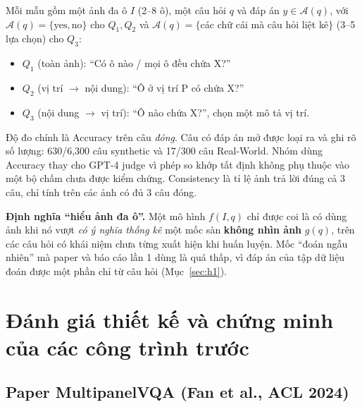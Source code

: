 \documentclass[12pt]{ai_conquer2026}
\begin{document}
Mỗi mẫu gồm một ảnh đa ô $I$ (2--8 ô), một câu hỏi $q$ và đáp án $y \in \mathcal{A}(q)$, với $\mathcal{A}(q) = \{\text{yes},\text{no}\}$ cho $Q_1, Q_2$ và $\mathcal{A}(q) = \{$các chữ cái mà câu hỏi liệt kê$\}$ (3--5 lựa chọn) cho $Q_3$:
\begin{itemize}
    \item $Q_1$ (toàn ảnh): ``Có ô nào / mọi ô đều chứa X?''
    \item $Q_2$ (vị trí $\rightarrow$ nội dung): ``Ô ở vị trí P có chứa X?''
    \item $Q_3$ (nội dung $\rightarrow$ vị trí): ``Ô nào chứa X?'', chọn một mô tả vị trí.
\end{itemize}
Độ đo chính là Accuracy trên câu \emph{đóng}. Câu có đáp án mở được loại ra và ghi rõ số lượng: 630/6{,}300 câu synthetic và 17/300 câu Real-World. Nhóm dùng Accuracy thay cho GPT-4 judge vì phép so khớp tất định không phụ thuộc vào một bộ chấm chưa được kiểm chứng. Consistency là tỉ lệ ảnh trả lời đúng cả 3 câu, chỉ tính trên các ảnh có đủ 3 câu đóng.

\textbf{Định nghĩa ``hiểu ảnh đa ô''.} Một mô hình $f(I,q)$ chỉ được coi là có dùng ảnh khi nó vượt \emph{có ý nghĩa thống kê} một mốc sàn \textbf{không nhìn ảnh} $g(q)$, trên các câu hỏi có khái niệm chưa từng xuất hiện khi huấn luyện. Mốc ``đoán ngẫu nhiên'' mà paper và báo cáo lần 1 dùng là quá thấp, vì đáp án của tập dữ liệu đoán được một phần chỉ từ câu hỏi (Mục~\ref{sec:h1}).

\section{Đánh giá thiết kế và chứng minh của các công trình trước}

\subsection{Paper MultipanelVQA (Fan et al., ACL 2024)}
\end{document}
